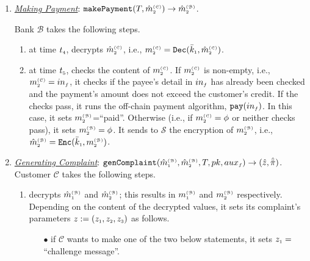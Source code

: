 \begin{enumerate}[leftmargin=.46cm]
\item\label{Making-Payment} \underline{\textit{Making Payment}}: $\mathtt{makePayment}(T, \hat m^{\scriptscriptstyle\mathcal{(C)}}_{\scriptscriptstyle2})\rightarrow \hat m^{\scriptscriptstyle\mathcal{(B)}}_{\scriptscriptstyle2}$.

Bank $\mathcal{B}$ takes the following steps. 
\begin{enumerate}
%
 \item at time $t_{\scriptscriptstyle 4}$, decrypts   $\hat m_{\scriptscriptstyle 2}^{\scriptscriptstyle(\mathcal C)}$, i.e.,  $ m_{\scriptscriptstyle 2}^{\scriptscriptstyle(\mathcal{C})}= \mathtt{Dec}(\bar k_{\scriptscriptstyle 1}, \hat m_{\scriptscriptstyle 2}^{\scriptscriptstyle(\mathcal C)})$.
 \item at time $t_{\scriptscriptstyle 5}$, checks the content of $m_{\scriptscriptstyle 2}^{\scriptscriptstyle(\mathcal C)}$. If $m_{\scriptscriptstyle 2}^{\scriptscriptstyle(\mathcal C)}$ is non-empty, i.e., $m_{\scriptscriptstyle 2}^{\scriptscriptstyle(\mathcal C)}=in_{\scriptscriptstyle f}$, it checks if the payee's detail in $in_{\scriptscriptstyle f}$ has already been checked and the payment's amount does not exceed the customer's credit. If the checks pass, it  runs the off-chain payment algorithm, $\mathtt{pay}(in_{\scriptscriptstyle f})$.  In this case, it sets $m_{\scriptscriptstyle 2}^{\scriptscriptstyle(\mathcal B)}$=``paid''. Otherwise (i.e., if $m_{\scriptscriptstyle 2}^{\scriptscriptstyle(\mathcal C)}=\phi$ or neither checks pass), it sets $m_{\scriptscriptstyle 2}^{\scriptscriptstyle(\mathcal B)}=\phi$. It sends  to $\mathcal{S}$ the encryption of  $m_{\scriptscriptstyle 2}^{\scriptscriptstyle(\mathcal B)}$, i.e., $\hat m_{\scriptscriptstyle 2}^{\scriptscriptstyle(\mathcal{B})}= \mathtt{Enc}(\bar k_{\scriptscriptstyle 1}, m_{\scriptscriptstyle 2}^{\scriptscriptstyle(\mathcal B)})$.  %
\end{enumerate}
%

\item\label{Generating-Complaint}  \underline{\textit{Generating Complaint}}: $\mathtt{genComplaint}(\hat m^{\scriptscriptstyle\mathcal{(B)}}_{\scriptscriptstyle 1}, \hat m^{\scriptscriptstyle\mathcal{(B)}}_{\scriptscriptstyle2}, T, pk, \\ {aux}_{\scriptscriptstyle f})\rightarrow  (\hat z, \hat{\ddot \pi})$. 
%
Customer $\mathcal{C}$ takes the following steps. 
\begin{enumerate}
%
\item\label{DR::C-sends-complaint} decrypts $ \hat m^{\scriptscriptstyle\mathcal{(B)}}_{\scriptscriptstyle 1}$ and $\hat m^{\scriptscriptstyle\mathcal{(B)}}_{\scriptscriptstyle2}$; this results in $  m^{\scriptscriptstyle\mathcal{(B)}}_{\scriptscriptstyle 1}$ and $ m^{\scriptscriptstyle\mathcal{(B)}}_{\scriptscriptstyle2}$ respectively. Depending on the content of  the decrypted values, it sets its complaint's parameters $z:=(z_{\scriptscriptstyle 1}, z_{\scriptscriptstyle 2}, z_{\scriptscriptstyle 3})$ as follows.  %

\begin{itemize}
%
%
 \item  [$\bullet$] if $\mathcal{C}$ wants to make one of the two below statements, it sets  $z_{\scriptscriptstyle 1}=$``challenge message''.
 

\end{itemize}
\end{enumerate}
\end{enumerate}
